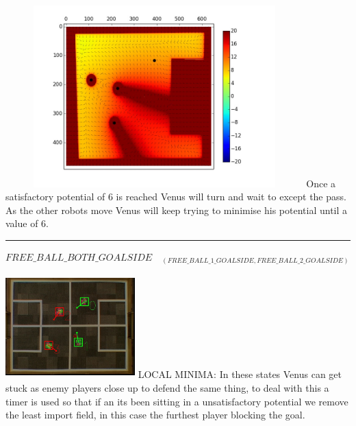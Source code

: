 \documentclass[a4paper,12pt]{article}
\begin{document}
\begin{minipage}{0.5\textwidth}
\includegraphics[height=70mm,width=115mm]{p4.jpg}\newline
Once a satisfactory potential of 6 is reached Venus will turn and wait to except the pass. As the other robots move Venus will keep trying to minimise his potential until a value of 6.
\end{minipage}\newline\newline
\rule{\textwidth}{1pt}\newline
$FREE\_BALL\_BOTH\_GOALSIDE\quad_{(FREE\_BALL\_1\_GOALSIDE, FREE\_BALL\_2\_GOALSIDE)}$ \newline \newline
\begin{minipage}{0.5\textwidth}
\includegraphics[height=40mm,width=50mm]{v5.jpg}\newline
LOCAL MINIMA: In these states Venus can get stuck as enemy players close up to defend the same thing, to deal with this a timer is used so that if an its been sitting in a unsatisfactory potential we remove the least import field, in this case the furthest player blocking the goal. 
\end{minipage}
\hspace{.2cm}
\end{document}
